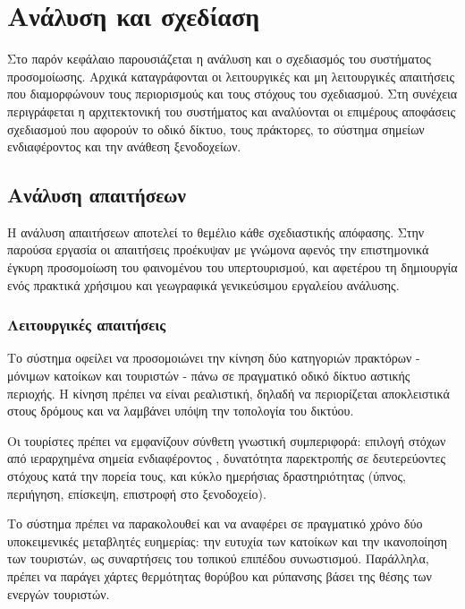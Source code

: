 \chapter{Ανάλυση και σχεδίαση}

Στο παρόν κεφάλαιο παρουσιάζεται η ανάλυση και ο σχεδιασμός
του συστήματος προσομοίωσης. Αρχικά καταγράφονται οι
λειτουργικές και μη λειτουργικές απαιτήσεις που
διαμορφώνουν τους περιορισμούς και τους στόχους του
σχεδιασμού. Στη συνέχεια περιγράφεται η αρχιτεκτονική του
συστήματος και αναλύονται οι επιμέρους αποφάσεις σχεδιασμού
που αφορούν το οδικό δίκτυο, τους πράκτορες, το σύστημα
σημείων ενδιαφέροντος και την ανάθεση ξενοδοχείων.

\section{Ανάλυση απαιτήσεων}

Η ανάλυση απαιτήσεων αποτελεί το θεμέλιο κάθε σχεδιαστικής
απόφασης. Στην παρούσα εργασία οι απαιτήσεις προέκυψαν με
γνώμονα αφενός την επιστημονικά έγκυρη προσομοίωση του
φαινομένου του υπερτουρισμού, και αφετέρου τη δημιουργία
ενός πρακτικά χρήσιμου και γεωγραφικά γενικεύσιμου
εργαλείου ανάλυσης.

\subsection{Λειτουργικές απαιτήσεις}

Το σύστημα οφείλει να προσομοιώνει την κίνηση δύο κατηγοριών
πρακτόρων - μόνιμων κατοίκων και τουριστών - πάνω σε
πραγματικό οδικό δίκτυο αστικής περιοχής. Η κίνηση πρέπει
να είναι ρεαλιστική, δηλαδή να περιορίζεται αποκλειστικά
στους δρόμους και να λαμβάνει υπόψη την τοπολογία του δικτύου.

Οι τουρίστες πρέπει να εμφανίζουν σύνθετη γνωστική
συμπεριφορά: επιλογή στόχων από ιεραρχημένα σημεία
ενδιαφέροντος , δυνατότητα παρεκτροπής σε
δευτερεύοντες στόχους κατά την πορεία τους, και κύκλο
ημερήσιας δραστηριότητας (ύπνος, περιήγηση, επίσκεψη,
επιστροφή στο ξενοδοχείο).

Το σύστημα πρέπει να παρακολουθεί και να αναφέρει σε
πραγματικό χρόνο δύο υποκειμενικές μεταβλητές ευημερίας:
την ευτυχία  των κατοίκων και την ικανοποίηση
 των τουριστών, ως συναρτήσεις του τοπικού
επιπέδου συνωστισμού. Παράλληλα, πρέπει να παράγει χάρτες
θερμότητας  θορύβου και ρύπανσης βάσει της
θέσης των ενεργών τουριστών.


